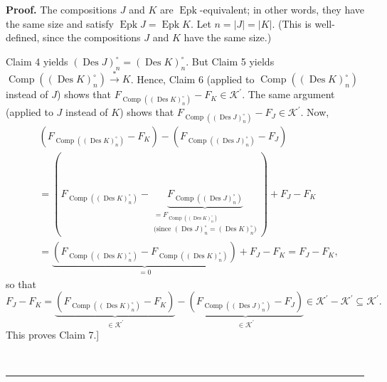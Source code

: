 \documentclass[numbers=enddot,12pt,final,onecolumn,notitlepage]{scrartcl}%
\theoremstyle{definition}
\newenvironment{proof}[1][Proof]{\noindent\textbf{#1.} }{\ \rule{0.5em}{0.5em}}
\begin{document}
\begin{proof}
The compositions $J$ and $K$ are $\operatorname*{Epk}$-equivalent; in other
words, they have the same size and satisfy $\operatorname*{Epk}%
J=\operatorname*{Epk}K$. Let $n=\left\vert J\right\vert =\left\vert
K\right\vert $. (This is well-defined, since the compositions $J$ and $K$ have
the same size.)

Claim 4 yields $\left(  \operatorname*{Des}J\right)  _{n}^{\circ}=\left(
\operatorname*{Des}K\right)  _{n}^{\circ}$. But Claim 5 yields
$\operatorname*{Comp}\left(  \left(  \operatorname*{Des}K\right)  _{n}^{\circ
}\right)  \overset{\ast}{\rightarrow}K$. Hence, Claim 6 (applied to
$\operatorname*{Comp}\left(  \left(  \operatorname*{Des}K\right)  _{n}^{\circ
}\right)  $ instead of $J$) shows that $F_{\operatorname*{Comp}\left(  \left(
\operatorname*{Des}K\right)  _{n}^{\circ}\right)  }-F_{K}\in\mathcal{K}%
^{\prime}$. The same argument (applied to $J$ instead of $K$) shows that
$F_{\operatorname*{Comp}\left(  \left(  \operatorname*{Des}J\right)
_{n}^{\circ}\right)  }-F_{J}\in\mathcal{K}^{\prime}$. Now,%
\begin{align*}
&  \left(  F_{\operatorname*{Comp}\left(  \left(  \operatorname*{Des}K\right)
_{n}^{\circ}\right)  }-F_{K}\right)  -\left(  F_{\operatorname*{Comp}\left(
\left(  \operatorname*{Des}J\right)  _{n}^{\circ}\right)  }-F_{J}\right) \\
&  =\left(  F_{\operatorname*{Comp}\left(  \left(  \operatorname*{Des}%
K\right)  _{n}^{\circ}\right)  }-\underbrace{F_{\operatorname*{Comp}\left(
\left(  \operatorname*{Des}J\right)  _{n}^{\circ}\right)  }}%
_{\substack{=F_{\operatorname*{Comp}\left(  \left(  \operatorname*{Des}%
K\right)  _{n}^{\circ}\right)  }\\\text{(since }\left(  \operatorname*{Des}%
J\right)  _{n}^{\circ}=\left(  \operatorname*{Des}K\right)  _{n}^{\circ
}\text{)}}}\right)  +F_{J}-F_{K}\\
&  =\underbrace{\left(  F_{\operatorname*{Comp}\left(  \left(
\operatorname*{Des}K\right)  _{n}^{\circ}\right)  }-F_{\operatorname*{Comp}%
\left(  \left(  \operatorname*{Des}K\right)  _{n}^{\circ}\right)  }\right)
}_{=0}+F_{J}-F_{K}=F_{J}-F_{K},
\end{align*}
so that%
\[
F_{J}-F_{K}=\underbrace{\left(  F_{\operatorname*{Comp}\left(  \left(
\operatorname*{Des}K\right)  _{n}^{\circ}\right)  }-F_{K}\right)  }%
_{\in\mathcal{K}^{\prime}}-\underbrace{\left(  F_{\operatorname*{Comp}\left(
\left(  \operatorname*{Des}J\right)  _{n}^{\circ}\right)  }-F_{J}\right)
}_{\in\mathcal{K}^{\prime}}\in\mathcal{K}^{\prime}-\mathcal{K}^{\prime
}\subseteq\mathcal{K}^{\prime}.
\]
This proves Claim 7.]


\end{proof}
\end{document}

